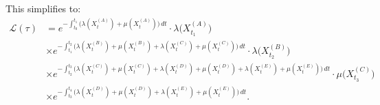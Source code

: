 \documentclass[11pt, headings=standardclasses, parskip=half, twoside]{scrartcl}
\begin{document}
This simplifies to:
\begin{align*}
\mathcal{L}(\tau)
  &=
e^{-\!\!\int_{t_0}^{t_1}\!\!\bigl(\lambda(X^{(A)}_t)+\mu(X^{(A)}_t)\bigr)\,dt}
\cdot
\lambda\bigl(X^{(A)}_{t_1}\bigr)
\\
&\times
     e^{-\!\!\int_{t_1}^{t_2}\!\!\bigl(\lambda(X^{(B)}_t)+\mu(X^{(B)}_t)
+\lambda(X^{(C)}_t)+\mu(X^{(C)}_t)\bigr)\,dt}
\cdot
\lambda\bigl(X^{(B)}_{t_2}\bigr)
\\
&\times
     e^{-\!\!\int_{t_2}^{t_3}\!\!\bigl(\lambda(X^{(C)}_t)+\mu(X^{(C)}_t)
+\lambda(X^{(D)}_t)+\mu(X^{(D)}_t)
+\lambda(X^{(E)}_t)+\mu(X^{(E)}_t)\bigr)\,dt}
\cdot
\mu\bigl(X^{(C)}_{t_3}\bigr)
\\
&\times
e^{-\!\!\int_{t_3}^{t_4}\!\!\bigl(\lambda(X^{(D)}_t)+\mu(X^{(D)}_t)
+\lambda(X^{(E)}_t)+\mu(X^{(E)}_t)\bigr)\,dt}.
\end{align*}
\end{document}
